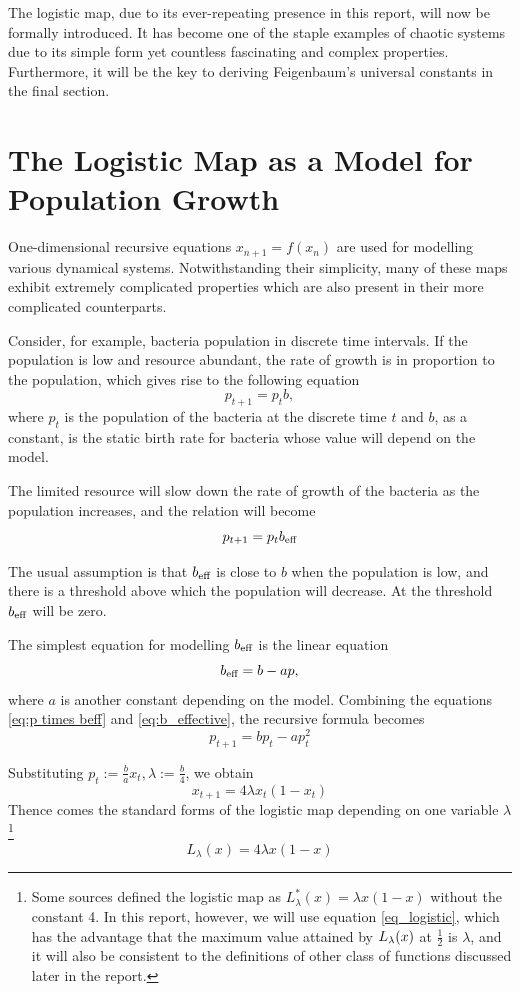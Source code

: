 The logistic map, due to its ever-repeating presence in this report, will now be formally introduced. It has become one of the staple examples of chaotic systems due to its simple form yet countless fascinating and complex properties. Furthermore, it will be the key to deriving Feigenbaum's universal constants in the final section.

\section{The Logistic Map as a Model for Population Growth}

One-dimensional recursive equations $x_{n+1} = f(x_n)$ are used for modelling various dynamical systems. 
Notwithstanding their simplicity, many of these maps exhibit extremely complicated properties which are also present in their more complicated counterparts.

Consider, for example, bacteria population in discrete time intervals. 
If the population is low and resource abundant, the rate of growth is in proportion to the population, which gives rise to the following equation
\begin{equation}\label{eq:1d iterative map}
p_{t+1} = p_{t} b,
\end{equation}
where $p_{t}$ is the population of the bacteria at the discrete time $t$ and $b$, as a constant, is the static birth rate for bacteria whose value will depend on the model.

The limited resource will slow down the rate of growth of the bacteria as the population increases, and the relation will become 
\begin{equation}\label{eq:p times beff}
	p_{t+1} =  p_{t} b_\text{eff}
\end{equation}

The usual assumption is that $b_\text{eff}$ is close to $b$ when the population is low, and there is a threshold above which the population will decrease. 
At the threshold $b_\text{eff}$ will be zero.

The simplest equation for modelling $b_\text{eff}$ is the linear equation
\begin{equation} \label{eq:b_effective}
b_\text{eff} = b - ap,
\end{equation}
where $a$ is another constant depending on the model.
Combining the equations \eqref{eq:p times beff} and \eqref{eq:b_effective}, the recursive formula becomes 
$$
p_{t+1}  = b p_t - ap_t^2
$$

Substituting $p_{t} := \frac{b}{a} x_{t}, \lambda := \frac{b}{4}$, we obtain
$$
x_{t+1} = 4 \lambda x_t(1-x_t) 
$$
Thence comes the standard forms of the logistic map depending on one variable $\lambda$
\footnote{
Some sources defined the logistic map as $L^*_{\lambda}(x) = \lambda x(1-x)$ without the constant 4. 
In this report, however, we will use equation \ref{eq_logistic}, which has the advantage that the maximum value attained by $L_{\lambda}(x)$ at $\frac{1}{2}$ is $\lambda$, and it will also be consistent to the definitions of other class of functions discussed later in the report.
}
\begin{equation}\label{eq_logistic}
	L_{\lambda}(x) = 4 \lambda x(1-x)
\end{equation}

